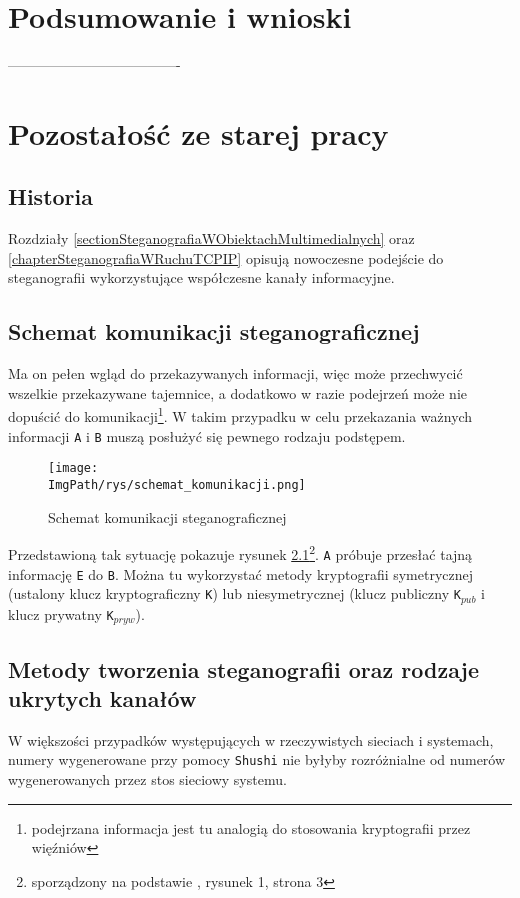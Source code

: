 \documentclass[a4paper,12pt,twoside,openany]{report}
\newcommand{\ImgPath}{.}
\newcommand{\tech}{\texttt}
\begin{document}
\chapter{Podsumowanie i wnioski}

-------------------------------------
\chapter{Pozostałość ze starej pracy}

\section{Historia}

Rozdziały \ref{sectionSteganografiaWObiektachMultimedialnych} oraz 
\ref{chapterSteganografiaWRuchuTCPIP} opisują nowoczesne podejście do 
steganografii wykorzystujące współczesne kanały informacyjne. 
\section{Schemat komunikacji steganograficznej}
\label{sectionSchematKomunikacjiSteganograficznej}
 Ma on pełen wgląd do przekazywanych 
informacji, więc może przechwycić wszelkie przekazywane tajemnice, a dodatkowo w 
razie podejrzeń może nie dopuścić do komunikacji\footnote{podejrzana informacja 
jest tu analogią do stosowania kryptografii przez więźniów}. W takim przypadku w 
celu przekazania ważnych informacji \tech{A} i \tech{B} muszą posłużyć się 
pewnego rodzaju podstępem. 
\begin{figure}[!htbp]
	\begin{center}
\centering
\texttt{[image: \\ImgPath/rys/schemat\_komunikacji.png]}
\end{center}
	\caption{Schemat komunikacji steganograficznej}
	\label{schematKomunikacji}
\end{figure}

Przedstawioną tak sytuację pokazuje rysunek 
\ref{schematKomunikacji}\footnote{sporządzony na podstawie 
\cite{schematKomunikacjiPrzypis}, rysunek 1, strona 3}. \tech{A} próbuje 
przesłać tajną informację \tech{E} do \tech{B}. Można tu wykorzystać metody kryptografii symetrycznej (ustalony 
klucz kryptograficzny \tech{K}) lub niesymetrycznej (klucz publiczny 
\tech{K}$_{pub}$ i klucz prywatny \tech{K}$_{pryw}$).

\section{Metody tworzenia steganografii oraz rodzaje ukrytych kanałów}
 W większości przypadków występujących w rzeczywistych sieciach i 
systemach, numery wygenerowane przy pomocy \tech{Shushi} nie byłyby rozróżnialne 
od numerów wygenerowanych przez stos sieciowy systemu.
\end{document}
